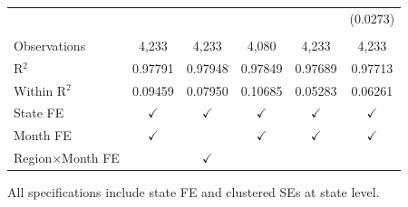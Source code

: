 \begin{table}[htbp]
\begin{tabular}{lccccc}
                              &                         &                        &                        &                         & (0.0273)\\   
       \\
      Observations            & 4,233                   & 4,233                  & 4,080                  & 4,233                   & 4,233\\  
      R$^2$                   & 0.97791                 & 0.97948                & 0.97849                & 0.97689                 & 0.97713\\  
      Within R$^2$            & 0.09459                 & 0.07950                & 0.10685                & 0.05283                 & 0.06261\\  
      State FE                & $\checkmark$            & $\checkmark$           & $\checkmark$           & $\checkmark$            & $\checkmark$\\   
      Month FE                & $\checkmark$            &                        & $\checkmark$           & $\checkmark$            & $\checkmark$\\   
      Region×Month FE         &                         & $\checkmark$           &                        &                         & \\  
      \bottomrule
   \end{tabular}
   
   \par \raggedright 
   All specifications include state FE and clustered SEs at state level.
\end{table}


